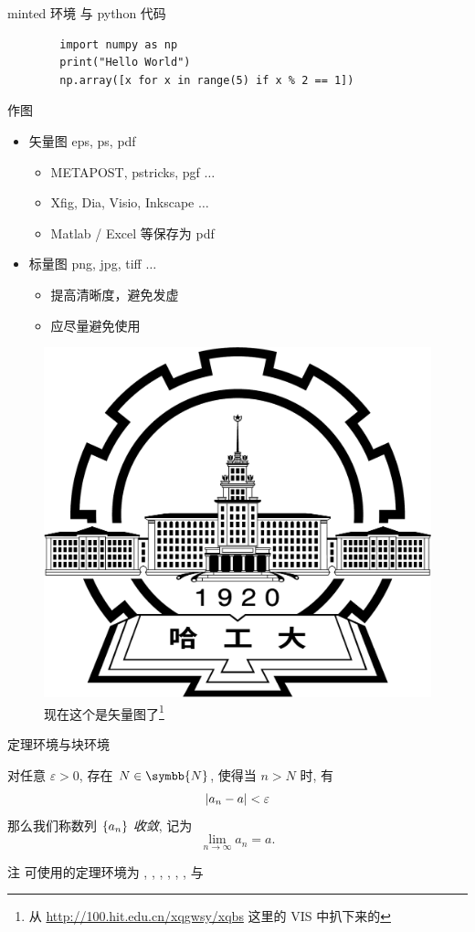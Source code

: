 \documentclass{beamer}
\begin{document}
\begin{frame}[fragile]{minted 环境 与 python 代码}
    \begin{verbatim}
        import numpy as np
        print("Hello World")
        np.array([x for x in range(5) if x % 2 == 1])
    \end{verbatim}
\end{frame}

\begin{frame}{作图}
    \begin{itemize}
        \item 矢量图 eps, ps, pdf
        \begin{itemize}
            \item METAPOST, pstricks, pgf $\ldots$
            \item Xfig, Dia, Visio, Inkscape $\ldots$
            \item Matlab / Excel 等保存为 pdf
        \end{itemize}
        \item 标量图 png, jpg, tiff $\ldots$
        \begin{itemize}
            \item 提高清晰度，避免发虚
            \item 应尽量避免使用
        \end{itemize}
    \end{itemize}
    \begin{figure}[htpb]
        \centering
        \includegraphics[width=0.2\linewidth]{pic/hitlogo.pdf}
        \caption{现在这个是矢量图了\footnote{从 \url{http://100.hit.edu.cn/xqgwsy/xqbs} 这里的 VIS 中扒下来的}}
    \end{figure}
    
\end{frame}

\begin{frame}{定理环境与块环境}
    \begin{definition}[数列极限]
        对任意 $ \varepsilon>0 $, 存在 $ N\in\symbb{N} $, 使得当 $ n>N $ 时, 有
        \[
            \abs{a_{n}-a}<\varepsilon
        \]   
        那么我们称数列 $ \qty{a_{n}} $ \emph{收敛}, 记为
        \[
            \lim_{n\to\infty}a_{n}=a.
        \]
    \end{definition}
    \begin{block}{注}
        可使用的定理环境为 , , , , , , 与   
    \end{block}
\end{frame}
\end{document}
